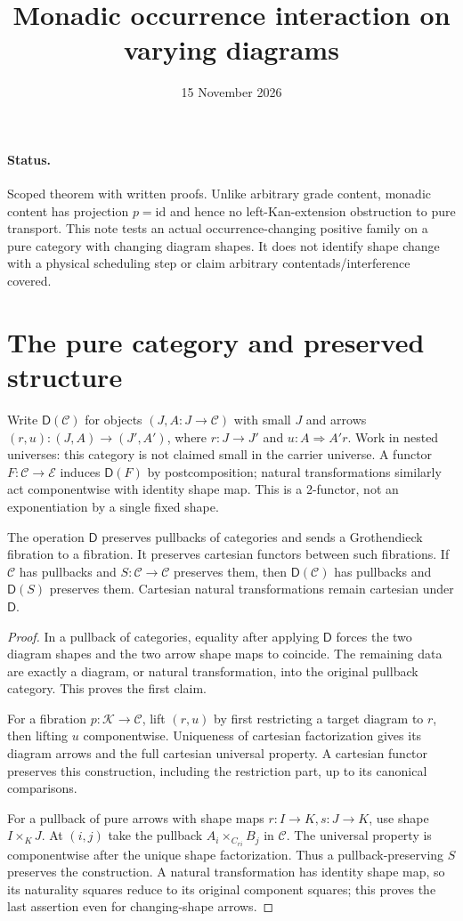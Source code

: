 \documentclass[11pt]{article}
\title{Monadic occurrence interaction on varying diagrams}
\date{15 November 2026}
\begin{document}
\maketitle
\paragraph{Status.} Scoped theorem with written proofs. Unlike arbitrary grade content, monadic content has projection $p=\mathrm{id}$ and hence no left-Kan-extension obstruction to pure transport. This note tests an actual occurrence-changing positive family on a pure category with changing diagram shapes. It does not identify shape change with a physical scheduling step or claim arbitrary contentads/interference covered.

\section{The pure category and preserved structure}
Write $\mathsf D(\mathcal C)$ for objects $(J,A:J\to\mathcal C)$ with small $J$ and arrows $(r,u):(J,A)\to(J',A')$, where $r:J\to J'$ and $u:A\Rightarrow A'r$. Work in nested universes: this category is not claimed small in the carrier universe. A functor $F:\mathcal C\to\mathcal E$ induces $\mathsf D(F)$ by postcomposition; natural transformations similarly act componentwise with identity shape map. This is a 2-functor, not an exponentiation by a single fixed shape.

\begin{lemma}
The operation $\mathsf D$ preserves pullbacks of categories and sends a Grothendieck fibration to a fibration. It preserves cartesian functors between such fibrations. If $\mathcal C$ has pullbacks and $S:\mathcal C\to\mathcal C$ preserves them, then $\mathsf D(\mathcal C)$ has pullbacks and $\mathsf D(S)$ preserves them. Cartesian natural transformations remain cartesian under $\mathsf D$.
\end{lemma}
\begin{proof}
In a pullback of categories, equality after applying $\mathsf D$ forces the two diagram shapes and the two arrow shape maps to coincide. The remaining data are exactly a diagram, or natural transformation, into the original pullback category. This proves the first claim.

For a fibration $p:\mathcal K\to\mathcal C$, lift $(r,u)$ by first restricting a target diagram to $r$, then lifting $u$ componentwise. Uniqueness of cartesian factorization gives its diagram arrows and the full cartesian universal property. A cartesian functor preserves this construction, including the restriction part, up to its canonical comparisons.

For a pullback of pure arrows with shape maps $r:I\to K,s:J\to K$, use shape $I\times_KJ$. At $(i,j)$ take the pullback $A_i\times_{C_{ri}}B_j$ in $\mathcal C$. The universal property is componentwise after the unique shape factorization. Thus a pullback-preserving $S$ preserves the construction. A natural transformation has identity shape map, so its naturality squares reduce to its original component squares; this proves the last assertion even for changing-shape arrows.
\end{proof}
\end{document}
